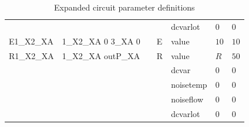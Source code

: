 \begin{table}[h]
\begin{tabular}[c]{lllllll}
\rowcolor{myyellow}
 & & & &\small{dcvarlot} &$0$ &$0$ \\ 
\small{E1\_X2\_XA} &\small{1\_X2\_XA 0 3\_XA 0 } & &\small{E} &\small{value} &$10$ &$10$ \\ 
\rowcolor{myyellow}
\small{R1\_X2\_XA} &\small{1\_X2\_XA outP\_XA } & &\small{R} &\small{value} &$R$ &$50$ \\ 
 & & & &\small{dcvar} &$0$ &$0$ \\ 
\rowcolor{myyellow}
 & & & &\small{noisetemp} &$0$ &$0$ \\ 
 & & & &\small{noiseflow} &$0$ &$0$ \\ 
\rowcolor{myyellow}
 & & & &\small{dcvarlot} &$0$ &$0$ \\ 
\end{tabular}
\caption{Expanded circuit parameter definitions}
\end{table}

